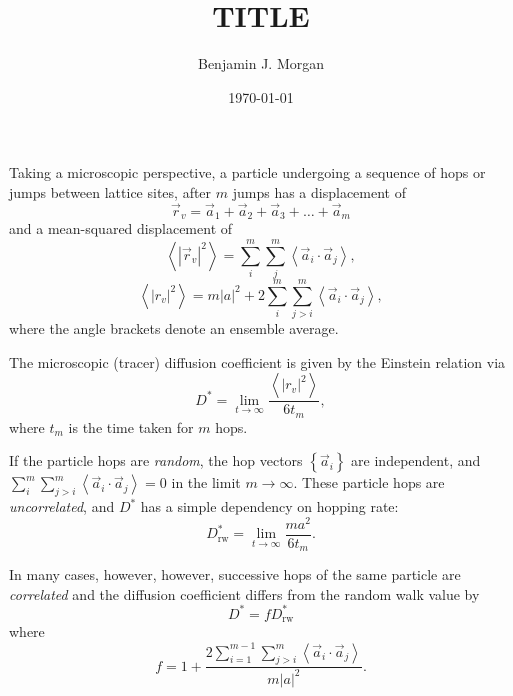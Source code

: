 \documentclass[aps,prl,twocolumn,superscriptaddress,reprint]{revtex4-1}
\begin{document}
\title{TITLE}
\author{Benjamin J. Morgan}

\date{\today}



\maketitle

Taking a microscopic perspective, a particle undergoing a sequence of hops or jumps between lattice sites, after $m$ jumps has a displacement of
\begin{equation}
  \vec{r}_v = \vec{a}_1 + \vec{a}_2 + \vec{a}_3 + \ldots + \vec{a}_m
\end{equation}
and a mean-squared displacement of
\begin{equation}
  \left< \left|\vec{r}_v\right|^2 \right> = \sum_i^m\sum_j^m\left<\vec{a}_i \cdot \vec{a}_j\right>,
  \label{eqn:msd}
\end{equation}
\begin{equation}
  \left< \left| r_v \right|^2 \right > = m\!\left|a\right|^2 + 2\sum_{i}^m\sum_{j>i}^m\left<\vec{a}_i\cdot \vec{a}_j\right>,
\end{equation}
where the angle brackets denote an ensemble average.

The microscopic (tracer) diffusion coefficient is given by the Einstein relation via
\begin{equation}
  D^* = \lim_{t\to\infty}\frac{\left< \left|r_v\right|^2 \right>}{6t_m},
\end{equation}
where $t_m$ is the time taken for $m$ hops.

If the particle hops are \emph{random}, the hop vectors $\left\{\vec{a}_i\right\}$ are independent, and $\sum_i^m\sum_{j>i}^m\left<\vec{a}_i\cdot \vec{a}_j\right>=0$ in the limit $m\to\infty$. These particle hops are \emph{uncorrelated}, and $D^*$ has a simple dependency on hopping rate:
\begin{equation}
  D^*_\mathrm{rw}=\lim_{t\to\infty}\frac{ma^2}{6t_m}.
\end{equation}

In many cases, however, however, successive hops of the same particle are \emph{correlated} and the diffusion coefficient differs from the random walk value by
\begin{equation}
  D^* = f D^*_\mathrm{rw}
\end{equation}
where
\begin{equation}
  f = 1 + \frac{2\displaystyle\sum_{i=1}^{m-1}\sum_{j>i}^{m}\left<\vec{a}_i \cdot \vec{a}_j\right>}{m\left|a\right|^2}.
\end{equation}
\end{document}
